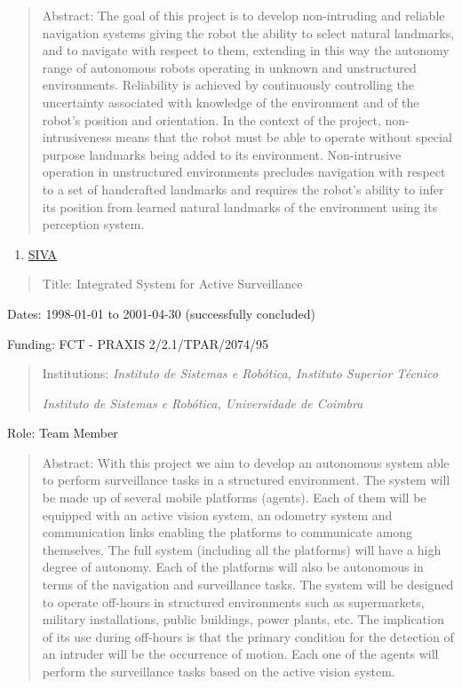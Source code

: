 \documentclass[
]{article}
\begin{document}
\begin{quote}
Abstract: The goal of this project is to develop non-intruding and
reliable navigation systems giving the robot the ability to select
natural landmarks, and to navigate with respect to them, extending in
this way the autonomy range of autonomous robots operating in unknown
and unstructured environments. Reliability is achieved by continuously
controlling the uncertainty associated with knowledge of the environment
and of the robot's position and orientation. In the context of the
project, non-intrusiveness means that the robot must be able to operate
without special purpose landmarks being added to its environment.
Non-intrusive operation in unstructured environments precludes
navigation with respect to a set of handcrafted landmarks and requires
the robot's ability to infer its position from learned natural landmarks
of the environment using its perception system.
\end{quote}

\begin{enumerate}
\def\labelenumi{\arabic{enumi}.}
\setcounter{enumi}{20}
\item
  \ul{SIVA}
\end{enumerate}

\begin{quote}
Title: Integrated System for Active Surveillance
\end{quote}

Dates: 1998-01-01 to 2001-04-30 (successfully concluded)

Funding: FCT - PRAXIS 2/2.1/TPAR/2074/95 \hl{}

\begin{quote}
Institutions: \emph{Instituto de Sistemas e Robótica, Instituto Superior
Técnico}

\emph{Instituto de Sistemas e Robótica, Universidade de Coimbra}
\end{quote}

Role: Team Member

\begin{quote}
Abstract: With this project we aim to develop an autonomous system able
to perform surveillance tasks in a structured environment. The system
will be made up of several mobile platforms (agents). Each of them will
be equipped with an active vision system, an odometry system and
communication links enabling the platforms to communicate among
themselves. The full system (including all the platforms) will have a
high degree of autonomy. Each of the platforms will also be autonomous
in terms of the navigation and surveillance tasks. The system will be
designed to operate off-hours in structured environments such as
supermarkets, military installations, public buildings, power plants,
etc. The implication of its use during off-hours is that the primary
condition for the detection of an intruder will be the occurrence of
motion. Each one of the agents will perform the surveillance tasks based
on the active vision system.
\end{quote}
\end{document}
